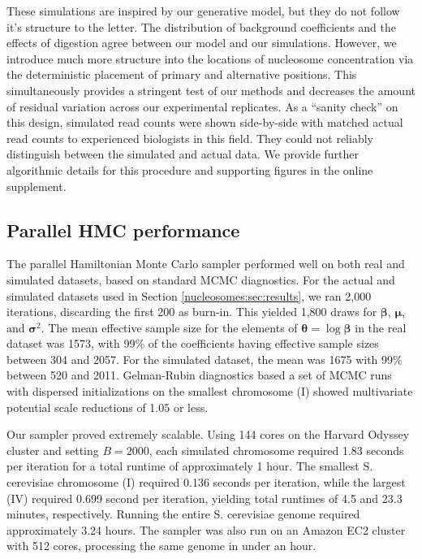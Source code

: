 These simulations are inspired by our generative model, but they do not follow it's structure to the letter.
The distribution of background coefficients and the effects of digestion agree between our model and our simulations.
However, we introduce much more structure into the locations of nucleosome concentration via the deterministic placement of primary and alternative positions.
This simultaneously provides a stringent test of our methods and decreases the amount of residual variation across our experimental replicates.
As a ``sanity check'' on this design, simulated read counts were shown side-by-side with matched actual read counts to experienced biologists in this field.
They could not reliably distinguish between the simulated and actual data.
We provide further algorithmic details for this procedure and supporting figures in the online supplement. %

\subsection{Parallel HMC performance}
\label{nucleosomes:sec:mcmcPerformance}

The parallel Hamiltonian Monte Carlo sampler performed well on both real and simulated datasets, based on standard MCMC diagnostics.
For the actual and simulated datasets used in Section \ref{nucleosomes:sec:results}, we ran 2,000 iterations, discarding the first 200 as burn-in.
This yielded 1,800 draws for $\bm \beta$, $\bm \mu$, and $\bm \sigma^2$.
The mean effective sample size for the elements of $\bm \theta = \log \bm \beta$ in the real dataset was 1573, with 99\% of the coefficients having effective sample sizes between 304 and 2057.
For the simulated dataset, the mean was 1675 with 99\% between 520 and 2011.
Gelman-Rubin diagnostics based a set of MCMC runs with dispersed initializations on the smallest chromosome (I) showed multivariate potential scale reductions of 1.05 or less.

Our sampler proved extremely scalable.
Using 144 cores on the Harvard Odyssey cluster and setting $B = 2000$, each simulated chromosome required 1.83 seconds per iteration for a total runtime of approximately 1 hour.
The smallest S. cerevisiae chromosome (I) required 0.136 seconds per iteration, while the largest (IV) required 0.699 second per iteration, yielding total runtimes of 4.5 and 23.3 minutes, respectively.
Running the entire S. cerevisiae genome required approximately 3.24 hours.
The sampler was also run on an Amazon EC2 cluster with 512 cores, processing the same genome in under an hour.

